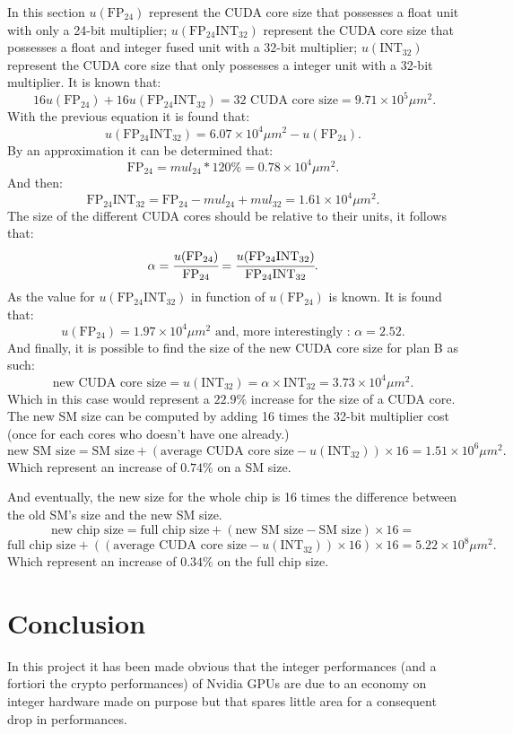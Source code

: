 \documentclass{report}
\begin{document}
   In this section $u(\text{FP}_{24})$ represent the CUDA core size that possesses a float unit with only a 24-bit multiplier; $u(\text{FP}_{24}\text{INT}_{32})$ represent the CUDA core size that possesses a float and integer fused unit with a 32-bit multiplier; $u(\text{INT}_{32})$ represent the CUDA core size that only possesses a integer unit with a 32-bit multiplier.
   It is known that:
   \[\
   16u(\text{FP}_{24}) + 16u(\text{FP}_{24}\text{INT}_{32}) = \text{32 CUDA core size} = 9.71 \times 10^5 \mu m^2. \]
   With the previous equation it is found that:
   \[u(\text{FP}_{24}\text{INT}_{32})  =  6.07 \times 10^4 \mu m^2 - u(\text{FP}_{24}).\]
   By an approximation it can be determined that: \[\text{FP}_{24} = mul_{24} * 120\% = 0.78 \times 10^4  \mu m^2.\]
   And then: \[\text{FP}_{24}\text{INT}_{32} = \text{FP}_{24} - mul_{24} + mul_{32} = 1.61 \times 10^4 \mu m^2.\]
   The size of the different CUDA cores should be relative to their units, it follows that:
   \[\alpha = \cfrac{u(\text{FP}_{24})}{\text{FP}_{24}} = \cfrac{u(\text{FP}_{24}\text{INT}_{32})}{\text{FP}_{24}\text{INT}_{32}}.\]
   As the value for $u(\text{FP}_{24}\text{INT}_{32})$ in function of $u(\text{FP}_{24})$ is known. It is found that:
   \[ u(\text{FP}_{24}) = 1.97 \times 10^4 \mu m^2 \text{ and, more interestingly : } \alpha = 2.52.\]
   And finally, it is possible to find the size of the new CUDA core size for plan B as such:
   \[ \text{new CUDA core size} = u(\text{INT}_{32}) = \alpha \times \text{INT}_{32} = 3.73 \times 10^4 \mu m^2.\]
   Which in this case would represent a $22.9\%$ increase for the size of a CUDA core.
   The new SM size can be computed by adding 16 times the 32-bit multiplier cost (once for each cores who doesn't have one already.)
    \[\text{new SM size} = \text{SM size} + (\text{average CUDA core size} - u(\text{INT}_{32})) \times 16 = 1.51 \times 10^6 \mu m^2. \]
    Which represent an increase of $0.74\%$ on a SM size.
    
    And eventually, the new size for the whole chip is 16 times the difference between the old SM's size and the new SM size.
    \[\text{new chip size} = \text{full chip size} + (\text{new SM size} - \text{SM size}) \times 16 =\]
    \[\text{full chip size} + ((\text{average CUDA core size} - u(\text{INT}_{32})) \times 16) \times  16 = 5.22 \times 10^8 \mu m^2. \]
    Which represent an increase of $0.34\%$ on the full chip size.
   
\chapter{Conclusion}
    In this project it has been made obvious that the integer performances 
    (and a fortiori the crypto performances) of Nvidia GPUs are due to an 
    economy on integer hardware made on purpose but that spares little area 
    for a consequent drop in performances. 
    
\end{document}
